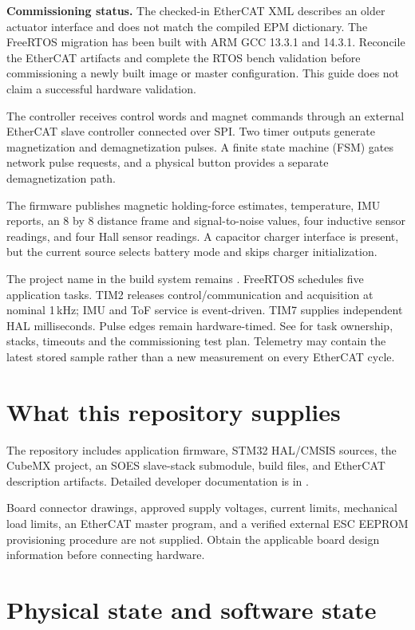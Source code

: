 \documentclass[10pt,a4paper,oneside]{report}
\newcommand{\code}[1]{\texttt{\detokenize{#1}}}
\begin{document}
\textbf{Commissioning status.} The checked-in EtherCAT XML describes an
older actuator interface and does not match the compiled EPM dictionary.
The FreeRTOS migration has been built with ARM GCC 13.3.1 and 14.3.1.
Reconcile the EtherCAT artifacts and complete the RTOS bench validation before
commissioning a newly built image or master configuration. This guide does not claim a
successful hardware validation.


The controller receives control words and magnet commands through an
external EtherCAT slave controller connected over SPI. Two timer outputs
generate magnetization and demagnetization pulses. A finite state machine
(FSM) gates network pulse requests, and a physical button provides a
separate demagnetization path.

The firmware publishes magnetic holding-force estimates, temperature,
IMU reports, an 8 by 8 distance frame and signal-to-noise values,
four inductive sensor readings, and four Hall sensor readings. A capacitor
charger interface is present, but the current source selects battery mode
and skips charger initialization.

The project name in the build system remains
\code{MagneckoFoot_Header}. FreeRTOS schedules five application tasks.
TIM2 releases control/communication and acquisition at nominal 1\,kHz;
IMU and ToF service is event-driven. TIM7 supplies independent HAL milliseconds.
Pulse edges remain hardware-timed. See  for task ownership,
stacks, timeouts and the commissioning test plan. Telemetry may contain the latest stored sample rather than a new
measurement on every EtherCAT cycle.

\section{What this repository supplies}

The repository includes application firmware, STM32 HAL/CMSIS sources,
the CubeMX project, an SOES slave-stack submodule, build files, and
EtherCAT description artifacts. Detailed developer documentation is in
.

Board connector drawings, approved supply voltages, current limits,
mechanical load limits, an EtherCAT master program, and a verified
external ESC EEPROM provisioning procedure are not supplied. Obtain
the applicable board design information before connecting hardware.

\section{Physical state and software state}
\end{document}
